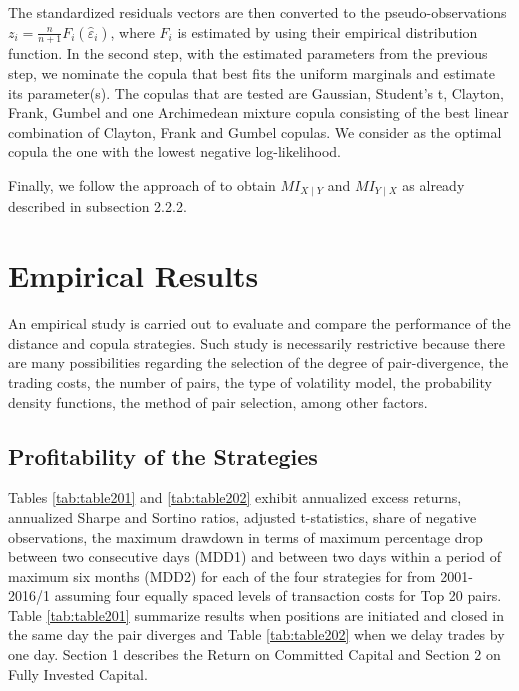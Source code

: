 \documentclass[a4paper,12pt]{report}
\begin{document}
\begin{refsection}
The standardized residuals vectors are then converted to the pseudo-observations $z_{i}=\frac{n}{n+1}F_{i}\left( \widehat{\varepsilon }_{i}\right) $, where $F_{i}$ is estimated by using their empirical distribution function. In the second step, with the estimated parameters from the previous step, we nominate the copula that best fits the uniform marginals and estimate its parameter(s). The copulas that are tested are Gaussian, Student's t, Clayton, Frank, Gumbel and one Archimedean mixture copula consisting of the best linear combination of Clayton, Frank and Gumbel copulas. We consider as the optimal copula the one with the lowest negative log-likelihood.

Finally, we follow the approach of \citet*{xie14} to obtain $MI_{X\mid Y}$ and $MI_{Y\mid X}$ as already described in subsection 2.2.2.

\vspace{0.6cm}

\section{Empirical Results}

An empirical study is carried out to evaluate and compare the performance of the distance and copula strategies. Such study is necessarily restrictive because there are many possibilities regarding the selection of the degree of pair-divergence, the trading costs, the number of pairs, the type of volatility model, the probability density functions, the method of pair selection, among other factors.

\vspace{0.3cm}

\subsection{Profitability of the Strategies}

Tables \ref{tab:table201} and \ref{tab:table202} exhibit annualized excess returns, annualized Sharpe and Sortino ratios, \citet*{nw87} adjusted t-statistics, share of negative observations, the maximum drawdown in terms of maximum percentage drop between two consecutive days (MDD1) and between two days within a period of maximum six months (MDD2) for each of the four strategies for from 2001-2016/1 assuming four equally spaced levels of transaction costs for Top 20 pairs. Table \ref{tab:table201} summarize results when positions are initiated and closed in the same day the pair diverges and Table \ref{tab:table202} when we delay trades by one day. Section 1 describes the Return on Committed Capital and Section 2 on Fully Invested Capital.


\end{refsection}
\end{document}

